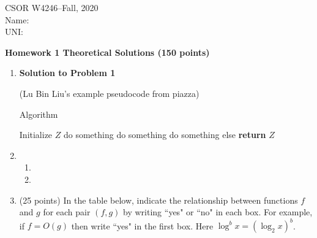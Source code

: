 \documentclass[11pt]{article}
\renewcommand\arraystretch{2.4}
\begin{document}
\begin{flushleft}
CSOR W4246--Fall, 2020 \\
Name: \\
UNI: \\
\end{flushleft}

\centerline{\bf Homework 1 Theoretical Solutions (150 points)}

\bigskip 
\bigskip


\begin{enumerate}
\item {\bf Solution to Problem 1}

(Lu Bin Liu's example pseudocode from piazza)

\begin{algorithm}
\caption{Algorithm}\label{alg:Algo}
\begin{algorithmic}[h!]
   \State Initialize $Z$
			\State do something
    \EndFor
  \State do something
 \Else
  \State do something else
 \EndIf
   \EndWhile
   \State \textbf{return} $Z$ 
\EndProcedure
\end{algorithmic}
\end{algorithm}

\bigskip
\item 
\begin{enumerate}
\item
\item 
\end{enumerate}



\renewcommand\arraystretch{1.0}

\newpage
\item(25 points) In the table below, indicate the relationship between functions $f$ and $g$ 
for each pair $(f, g)$  by writing  ``yes" or ``no"  in each box. For example, 
if $f=O(g)$ then write ``yes"  in the first box. Here $\log^b{x} = (\log_2{x})^b$.

\renewcommand\arraystretch{1.5}


\end{enumerate}
\end{document}
